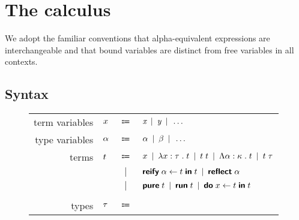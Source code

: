 \section{The calculus}

  We adopt the familiar conventions that alpha-equivalent expressions are interchangeable and that bound variables are distinct from free variables in all contexts.

  \subsection{Syntax}

    \begin{figure}[H]
      \begin{center}
        \begin{tabular}{r l c l}
          term variables & \(x\) & \(\Coloneqq\) & \(
            \textit{x}                                             \enspace | \enspace
            \textit{y}                                             \enspace | \enspace
            \ldots                                          \) \\
          type variables & \(\alpha\) & \(\Coloneqq\) & \(
            \alpha                                             \enspace | \enspace
            \beta                                             \enspace | \enspace
            \ldots                                          \) \\
          terms & \(t\) & \(\Coloneqq\) & \(
            x                                           \enspace | \enspace
            \lambda x : \tau \; . \; t                      \enspace | \enspace
            t \; t                             \enspace | \enspace
            \Lambda \alpha : \kappa \; . \; t                     \enspace | \enspace
            t \; \tau                            \) \\
          & & \(|\) & \(
            \textsf{\textbf{reify}} \; \alpha \leftarrow t \; \textsf{\textbf{in}} \; t                    \enspace | \enspace
            \textsf{\textbf{reflect}} \; \alpha                                \) \\
          & & \(|\) & \(
            \textsf{\textbf{pure}} \; t                                   \enspace | \enspace
            \textsf{\textbf{run}} \; t                                    \enspace | \enspace
            \textsf{\textbf{do}} \; x \leftarrow t \; \textsf{\textbf{in}} \; t                       \) \\ \\
          types & \(\tau\) & \(\Coloneqq\) & \(
            \tVar                                           \enspace | \enspace

\end{tabular}
\end{center}
\end{figure}

